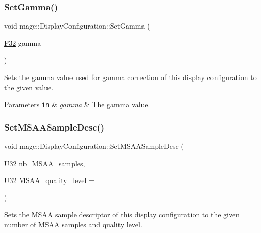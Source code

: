 \subsubsection{\texorpdfstring{Set\+Gamma()}{SetGamma()}}
{\footnotesize\ttfamily void mage\+::\+Display\+Configuration\+::\+Set\+Gamma (\begin{DoxyParamCaption}\item[{\hyperlink{namespacemage_aa97e833b45f06d60a0a9c4fc22ae02c0}{F32}}]{gamma }\end{DoxyParamCaption})\hspace{0.3cm}{\ttfamily [noexcept]}}

Sets the gamma value used for gamma correction of this display configuration to the given value.


\begin{DoxyParams}[1]{Parameters}
\mbox{\tt in}  & {\em gamma} & The gamma value. \\
\hline
\end{DoxyParams}
\hypertarget{structmage_1_1_display_configuration_a5bc7c91f769b58c1e021abf278e699c6}{}\label{structmage_1_1_display_configuration_a5bc7c91f769b58c1e021abf278e699c6} 
\subsubsection{\texorpdfstring{Set\+M\+S\+A\+A\+Sample\+Desc()}{SetMSAASampleDesc()}\hspace{0.1cm}{\footnotesize\ttfamily [1/2]}}
{\footnotesize\ttfamily void mage\+::\+Display\+Configuration\+::\+Set\+M\+S\+A\+A\+Sample\+Desc (\begin{DoxyParamCaption}\item[{\hyperlink{namespacemage_a41c104c036fba3756a74e19f793eeaa1}{U32}}]{nb\+\_\+\+M\+S\+A\+A\+\_\+samples,  }\item[{\hyperlink{namespacemage_a41c104c036fba3756a74e19f793eeaa1}{U32}}]{M\+S\+A\+A\+\_\+quality\+\_\+level = {} }\end{DoxyParamCaption})\hspace{0.3cm}{\ttfamily [noexcept]}}

Sets the M\+S\+AA sample descriptor of this display configuration to the given number of M\+S\+AA samples and quality level.


